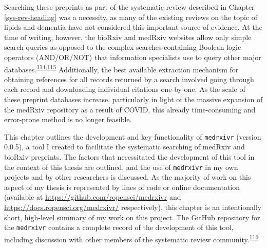 \documentclass[a4paper, twoside]{templates/ociamthesis}
\begin{document}
Searching these preprints as part of the systematic review described in Chapter \ref{sys-rev-heading} was a necessity, as many of the existing reviews on the topic of lipids and dementia have not considered this important source of evidence. At the time of writing, however, the bioRxiv and medRxiv websites allow only simple search queries as opposed to the complex searches containing Boolean logic operators (AND/OR/NOT) that information specialists use to query other major databases.\textsuperscript{\protect\hyperlink{ref-bramer2018}{114},\protect\hyperlink{ref-gusenbauer2020}{115}} Additionally, the best available extraction mechanism for obtaining references for all records returned by a search involved going through each record and downloading individual citations one-by-one. As the scale of these preprint databases increase, particularly in light of the massive expansion of the medRxiv repository as a result of COVID, this already time-consuming and error-prone method is no longer feasible.

This chapter outlines the development and key functionality of \texttt{medrxivr} (version 0.0.5), a tool I created to facilitate the systematic searching of medRxiv and bioRxiv preprints. The factors that necessitated the development of this tool in the context of this thesis are outlined, and the use of \texttt{medrxivr} in my own projects and by other researchers is discussed. As the majority of work on this aspect of my thesis is represented by lines of code or online documentation (available at \url{https://github.com/ropensci/medrxivr} and \url{https://docs.ropensci.org/medrxivr/} respectively), this chapter is an intentionally short, high-level summary of my work on this project. The GitHub repository for the \texttt{medrxivr} contains a complete record of the development of this tool, including discussion with other members of the systematic review community.\textsuperscript{\protect\hyperlink{ref-zotero-15029}{116}}

~
\end{document}
